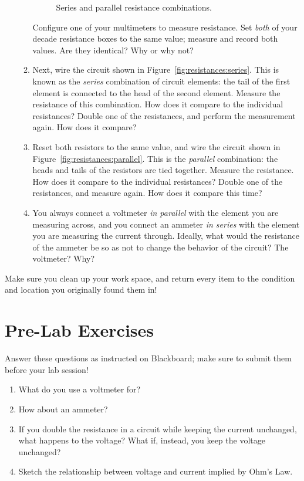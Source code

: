 \documentclass[12pt]{article}
\begin{document}
\begin{enumerate}
\begin{enumerate}
\begin{figure}
{      }
      \caption{Series and parallel resistance combinations.}
      \label{fig:resistances}
    \end{figure}
    Configure one of your multimeters to measure resistance.  Set
    \textit{both} of your decade resistance boxes to the same value;
    measure and record both values.  Are they identical?  Why or why
    not?
  \item \label{item:series} Next, wire the circuit shown in
    Figure~\ref{fig:resistances:series}.  This is known as the
    \textit{series} combination of circuit elements: the tail of the
    first element is connected to the head of the second element.
    Measure the resistance of this combination.  How does it compare
    to the individual resistances?  Double one of the resistances, and
    perform the measurement again.  How does it compare?
  \item \label{item:parallel} Reset both resistors to the same value,
    and wire the circuit shown in
    Figure~\ref{fig:resistances:parallel}.  This is the
    \textit{parallel} combination: the heads and tails of the
    resistors are tied together.  Measure the resistance.  How does it
    compare to the individual resistances?  Double one of the
    resistances, and measure again.  How does it compare this time?
  \item You always connect a voltmeter \textit{in parallel} with the
    element you are measuring across, and you connect an ammeter
    \textit{in series} with the element you are measuring the current
    through.  Ideally, what would the resistance of the ammeter be so
    as not to change the behavior of the circuit?  The voltmeter?
    Why? 
  \end{enumerate}
\end{enumerate}

Make sure you clean up your work space, and return every item to the
condition and location you originally found them in!

\newpage

\section*{Pre-Lab Exercises}

Answer these questions as instructed on Blackboard; make sure to
submit them before your lab session!

\begin{enumerate}
\item What do you use a voltmeter for?
\item How about an ammeter?
\item If you double the resistance in a circuit while keeping the
  current unchanged, what happens to the voltage?  What if, instead,
  you keep the voltage unchanged?
\item Sketch the relationship between voltage and current implied by
  Ohm's Law.
\end{enumerate}
\end{document}
